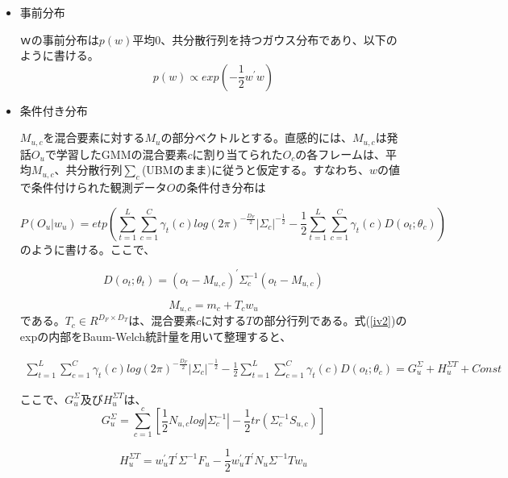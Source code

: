 \begin{itemize}
\item 事前分布\par
$ｗ$の事前分布は$p(w)$平均0、共分散行列を持つガウス分布であり、以下のように書ける。
\begin{equation}
\label{iv1}
p(w)\propto exp(-\frac{1}{2}w^{\prime}w)
\end{equation}

\item 条件付き分布\par
$M_{u,c}$を混合要素に対する$M_u$の部分ベクトルとする。直感的には、$M_{u,c}$は発話$O_u$で学習したGMMの混合要素$c$に割り当てられた$O_c$の各フレームは、平均$M_{u,c}$、共分散行列$\sum_{c}$(UBMのまま)に従うと仮定する。すなわち、$w$の値で条件付けられた観測データ$O$の条件付き分布は

\begin{equation}
\label{iv2}
P(O_u|w_u)=etp\left(\sum_{t=1}^{L}\sum_{c=1}^{C}\gamma_t(c)log(2\pi )^{-\frac{D_F}{2}}\left|\Sigma_{c}\right|^{-\frac{1}{2}}-\frac{1}{2}\sum_{t=1}^{L}\sum_{c=1}^{C}\gamma_t(c)D(o_t;\theta_c) \right)
\end{equation}
のように書ける。ここで、

\begin{equation}
D(o_t;\theta_t)=(o_t-M_{u,c})^\prime \Sigma_{c}^{-1}(o_t-M_{u,c})
\end{equation}

\begin{equation}
M_{u,c}=m_c+T_cw_u
\end{equation}
である。$T_c\in R^{D_F\times D_T}$は、混合要素$c$に対する$T$の部分行列である。式(\ref{iv2})のexpの内部をBaum-Welch統計量を用いて整理すると、

\begin{equation}
\begin{split}
\sum_{t=1}^{L}\sum_{c=1}^{C}\gamma_t(c)log(2\pi )^{-\frac{D_F}{2}}\left|\Sigma_{c}\right|^{-\frac{1}{2}}-\frac{1}{2}\sum_{t=1}^{L}\sum_{c=1}^{C}\gamma_t(c)D(o_t;\theta_c)=G_u^\Sigma+H_u^{\Sigma T}+Const
\end{split}
\end{equation}

ここで、$G_u^\Sigma$及び$H_u^{\Sigma T}$は、
\begin{equation}
G_u^\Sigma=\sum_{c=1}^c\left[\frac{1}{2}N_{u,c}log\left|\Sigma_c^{-1}\right|-\frac{1}{2}tr\left(\Sigma_c^{-1}S_{u,c}\right)\right]
\end{equation}

\begin{equation}
\label{iv3}
H_u^{\Sigma T}=w_u^\prime T^\prime \Sigma^{-1}F_u-\frac{1}{2}w_u^\prime T^\prime N_u\Sigma^{-1}Tw_u
\end{equation}


\end{itemize}
